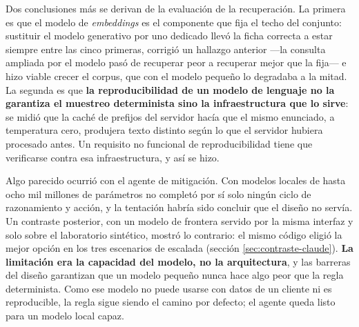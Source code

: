 Dos conclusiones más se derivan de la evaluación de la recuperación. La primera es que el modelo
de \emph{embeddings} es el componente que fija el techo del conjunto: sustituir el modelo
generativo por uno dedicado llevó la ficha correcta a estar siempre entre las cinco primeras,
corrigió un hallazgo anterior ---la consulta ampliada por el modelo pasó de recuperar peor a
recuperar mejor que la fija--- e hizo viable crecer el corpus, que con el modelo pequeño lo
degradaba a la mitad. La segunda es que \textbf{la reproducibilidad de un modelo de lenguaje no la
garantiza el muestreo determinista sino la infraestructura que lo sirve}: se midió que la caché de
prefijos del servidor hacía que el mismo enunciado, a temperatura cero, produjera texto distinto
según lo que el servidor hubiera procesado antes. Un requisito no funcional de reproducibilidad
tiene que verificarse contra esa infraestructura, y así se hizo.

Algo parecido ocurrió con el agente de mitigación. Con modelos locales de hasta ocho mil millones de
parámetros no completó por sí solo ningún ciclo de razonamiento y acción, y la tentación habría sido
concluir que el diseño no servía. Un contraste posterior, con un modelo de frontera servido por la
misma interfaz y solo sobre el laboratorio sintético, mostró lo contrario: el mismo código eligió la
mejor opción en los tres escenarios de escalada (sección \ref{sec:contraste-claude}). \textbf{La
limitación era la capacidad del modelo, no la arquitectura}, y las barreras del diseño garantizan que
un modelo pequeño nunca hace algo peor que la regla determinista. Como ese modelo no puede usarse con
datos de un cliente ni es reproducible, la regla sigue siendo el camino por defecto; el agente queda
listo para un modelo local capaz.

